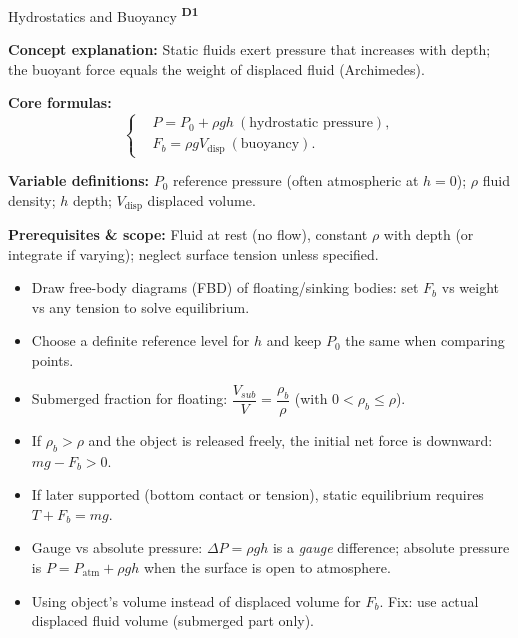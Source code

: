 ﻿\documentclass[12pt,a4paper]{article}
\providecommand{\KPFormulas}{}
\providecommand{\KPHeuristics}{}
\newcommand{\DOne}{\texorpdfstring{\textsuperscript{\textbf{D1}}}{ D1}}
\begin{document}

\begin{KnowledgePoint}{Hydrostatics and Buoyancy \DOne}
  \KPFormulas
  \begin{formulabox}
  \textbf{Concept explanation:} Static fluids exert pressure that increases with depth; the buoyant force equals the weight of displaced fluid (Archimedes).

  \textbf{Core formulas:}
  \[
  \left\{\begin{aligned}
    &P=P_0+\rho g h\ (\text{hydrostatic pressure}),\\
    &F_b=\rho g V_{\text{disp}}\ (\text{buoyancy}).
  \end{aligned}\right.
  \]

  \textbf{Variable definitions:} $P_0$ reference pressure (often atmospheric at $h=0$); $\rho$ fluid density; $h$ depth; $V_{\text{disp}}$ displaced volume.

  

  \textbf{Prerequisites \& scope:} Fluid at rest (no flow), constant $\rho$ with depth (or integrate if varying); neglect surface tension unless specified.
  \end{formulabox}

  \KPHeuristics
  \begin{heuristicsbox}
  \begin{itemize}[leftmargin=*]
    \item Draw free-body diagrams (FBD) of floating/sinking bodies: set $F_b$ vs weight vs any tension to solve equilibrium.
    \item Choose a definite reference level for $h$ and keep $P_0$ the same when comparing points.
    \item Submerged fraction for floating: $\dfrac{V_{sub}}{V}=\dfrac{\rho_b}{\rho}$ (with $0<\rho_b\le\rho$).
    \item If $\rho_b>\rho$ and the object is released freely, the initial net force is downward: $mg-F_b>0$.
    \item If later supported (bottom contact or tension), static equilibrium requires $T+F_b=mg$.
    \item Gauge vs absolute pressure: $\Delta P=\rho g h$ is a \emph{gauge} difference; absolute pressure is $P= P_{\text{atm}}+\rho g h$ when the surface is open to atmosphere.
  \end{itemize}
  \vspace{0.4em}
  \begin{itemize}[leftmargin=*]
    \item Using object's volume instead of displaced volume for $F_b$. Fix: use actual displaced fluid volume (submerged part only).
  \end{itemize}
  \end{heuristicsbox}


\end{KnowledgePoint}
\end{document}
